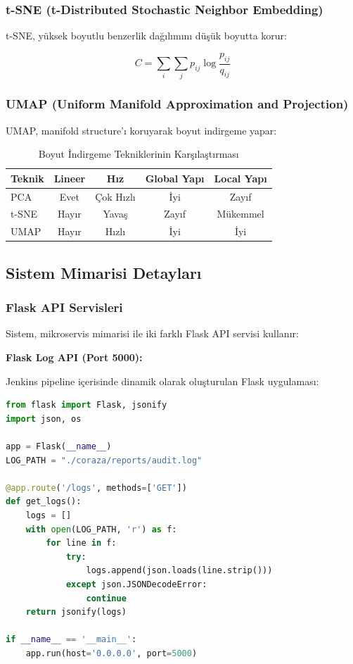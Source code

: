 \subsubsection{t-SNE (t-Distributed Stochastic Neighbor Embedding)}

t-SNE, yüksek boyutlu benzerlik dağılımını düşük boyutta korur:

\begin{equation}
C = \sum_i \sum_j p_{ij} \log \frac{p_{ij}}{q_{ij}}
\label{eq:tsne_cost}
\end{equation}

\newpage

\subsubsection{UMAP (Uniform Manifold Approximation and Projection)}

UMAP, manifold structure'ı koruyarak boyut indirgeme yapar:

\begin{table}[!ht]
\centering
\caption{Boyut İndirgeme Tekniklerinin Karşılaştırması}
\label{tab:dim_reduction_comparison}
\begin{tabular}{|l|c|c|c|c|}
\hline
\textbf{Teknik} & \textbf{Lineer} & \textbf{Hız} & \textbf{Global Yapı} & \textbf{Local Yapı} \\
\hline
PCA & Evet & Çok Hızlı & İyi & Zayıf \\
\hline
t-SNE & Hayır & Yavaş & Zayıf & Mükemmel \\
\hline
UMAP & Hayır & Hızlı & İyi & İyi \\
\hline
\end{tabular}
\end{table}

\subsection{Sistem Mimarisi Detayları}

\subsubsection{Flask API Servisleri}

Sistem, mikroservis mimarisi ile iki farklı Flask API servisi kullanır:

\textbf{Flask Log API (Port 5000):}

Jenkins pipeline içerisinde dinamik olarak oluşturulan Flask uygulaması:

\begin{lstlisting}[language=python]
from flask import Flask, jsonify
import json, os

app = Flask(__name__)
LOG_PATH = "./coraza/reports/audit.log"

@app.route('/logs', methods=['GET'])
def get_logs():
    logs = []
    with open(LOG_PATH, 'r') as f:
        for line in f:
            try:
                logs.append(json.loads(line.strip()))
            except json.JSONDecodeError:
                continue
    return jsonify(logs)

if __name__ == '__main__':
    app.run(host='0.0.0.0', port=5000)
\end{lstlisting}

